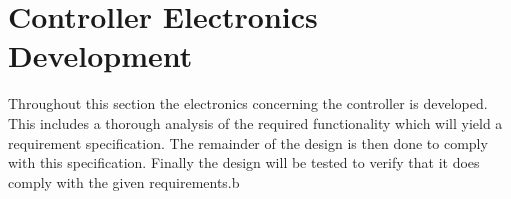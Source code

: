 \section{Controller Electronics Development}
\label{sec:controller_board}
Throughout this section the electronics concerning the controller is developed.
This includes a thorough analysis of the required functionality which will yield a requirement specification.
The remainder of the design is then done to comply with this specification.
Finally the design will be tested to verify that it does comply with the given requirements.b



